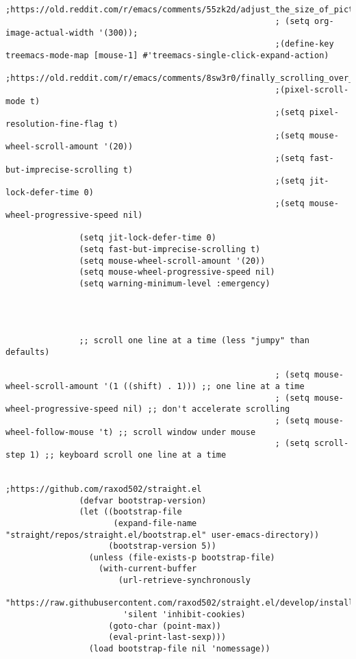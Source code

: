 \documentclass[11pt]{article}
\begin{document}
\begin{verbatim}

                                                       ;https://old.reddit.com/r/emacs/comments/55zk2d/adjust_the_size_of_pictures_to_be_shown_inside/
                                                       ; (setq org-image-actual-width '(300));
                                                       ;(define-key treemacs-mode-map [mouse-1] #'treemacs-single-click-expand-action)
                                                       ;https://old.reddit.com/r/emacs/comments/8sw3r0/finally_scrolling_over_large_images_with_pixel/
                                                       ;(pixel-scroll-mode t)
                                                       ;(setq pixel-resolution-fine-flag t)
                                                       ;(setq mouse-wheel-scroll-amount '(20))
                                                       ;(setq fast-but-imprecise-scrolling t)
                                                       ;(setq jit-lock-defer-time 0)
                                                       ;(setq mouse-wheel-progressive-speed nil)

               (setq jit-lock-defer-time 0)
               (setq fast-but-imprecise-scrolling t)
               (setq mouse-wheel-scroll-amount '(20))
               (setq mouse-wheel-progressive-speed nil)
               (setq warning-minimum-level :emergency)




               ;; scroll one line at a time (less "jumpy" than defaults)

                                                       ; (setq mouse-wheel-scroll-amount '(1 ((shift) . 1))) ;; one line at a time
                                                       ; (setq mouse-wheel-progressive-speed nil) ;; don't accelerate scrolling
                                                       ; (setq mouse-wheel-follow-mouse 't) ;; scroll window under mouse
                                                       ; (setq scroll-step 1) ;; keyboard scroll one line at a time

                                                       ;https://github.com/raxod502/straight.el
               (defvar bootstrap-version)
               (let ((bootstrap-file
                      (expand-file-name "straight/repos/straight.el/bootstrap.el" user-emacs-directory))
                     (bootstrap-version 5))
                 (unless (file-exists-p bootstrap-file)
                   (with-current-buffer
                       (url-retrieve-synchronously
                        "https://raw.githubusercontent.com/raxod502/straight.el/develop/install.el"
                        'silent 'inhibit-cookies)
                     (goto-char (point-max))
                     (eval-print-last-sexp)))
                 (load bootstrap-file nil 'nomessage))



\end{verbatim}
\end{document}
